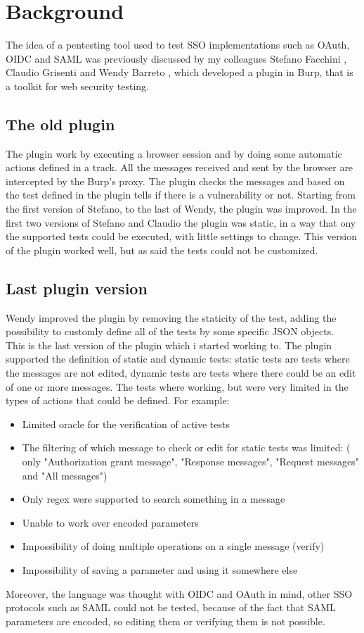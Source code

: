 \chapter{Background}
\label{Background}

The idea of a pentesting tool used to test SSO implementations such as OAuth, OIDC and SAML was previously discussed by my colleagues Stefano Facchini \cite{stefano_faccini}, Claudio Grisenti \cite{claudio_grisenti} and Wendy Barreto \cite{wendy_barreto}, which developed a plugin in Burp, that is a toolkit for web security testing.

\section{The old plugin}
The plugin work by executing a browser session and by doing some automatic actions defined in a track. All the messages received and sent by the browser are intercepted by the Burp's proxy. The plugin checks the messages and based on the test defined in the plugin tells if there is a vulnerability or not.
Starting from the first version of Stefano, to the last of Wendy, the plugin was improved. In the first two versions of Stefano and Claudio the plugin was static, in a way that ony the supported tests could be executed, with little settings to change. This version of the plugin worked well, but as said the tests could not be customized.

\section{Last plugin version}
Wendy improved the plugin by removing the staticity of the test, adding the possibility to customly define all of the tests by some specific JSON objects. \\
This is the last version of the plugin which i started working to. The plugin supported the definition of static and dynamic tests: static tests are tests where the messages are not edited, dynamic tests are tests where there could be an edit of one or more messages. The tests where working, but were very limited in the types of actions that could be defined. For example:
\begin{itemize}
    \item Limited oracle for the verification of active tests
    \item The filtering of which message to check or edit for static tests was limited: ( only "Authorization grant message", "Response messages", "Request messages" and "All messages")
    \item Only regex were supported to search something in a message
    \item Unable to work over encoded parameters
    \item Impossibility of doing multiple operations on a single message (verify)
    \item Impossibility of saving a parameter and using it somewhere else
\end{itemize}
Moreover, the language was thought with OIDC and OAuth in mind, other SSO protocols such as SAML could not be tested, because of the fact that SAML parameters are encoded, so editing them or verifying them is not possible.


